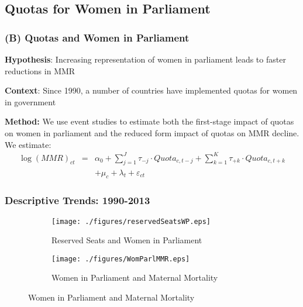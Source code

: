 \documentclass[9pt,letterpaper,subeqn]{beamer}
\begin{document}
\subsection{Quotas for  Women in Parliament}
\begin{frame}[label=Quotas]
\frametitle{(B) Quotas and Women in Parliament}
\textbf{Hypothesis}: Increasing representation of women in parliament leads to faster
reductions in MMR \\
\vspace{3mm}

\textbf{Context}: Since 1990, a number of countries have implemented quotas for women in government
 \\
\vspace{3mm}

\textbf{Method:} We use event studies to estimate both the first-stage impact of quotas on women in parliament and the reduced form impact of quotas on MMR decline. We estimate:
\begin{eqnarray}
  \log(MMR)_{ct} &=& \alpha_0 + \sum_{j=1}^J \tau_{-j}\cdot Quota_{c,t-j} + \sum_{k=1}^K \tau_{+k}\cdot Quota_{c,t+k} \nonumber \\
  && + \mu_c + \lambda_t + \varepsilon_{ct} \nonumber
\end{eqnarray}



\end{frame}




\begin{frame}
  \frametitle{Descriptive Trends: 1990-2013}
\begin{figure}[htpb!]
  \begin{center}
    \caption{Reserved Seats, Women in Parliament and Maternal Mortality over Time}
    \label{fig:time}
    \begin{subfigure}{.5\textwidth}
      \centering
      \texttt{[image: ./figures/reservedSeatsWP.eps]}
      \caption{Reserved Seats and Women in Parliament}
      \label{fig:seatsWP}
    \end{subfigure}%
    \begin{subfigure}{.5\textwidth}
      \centering
      \texttt{[image: ./figures/WomParlMMR.eps]}
      \caption{Women in Parliament and Maternal Mortality}
      \label{fig:WPMMR}
    \end{subfigure}
  \end{center}
\end{figure}
\end{frame}
\end{document}
